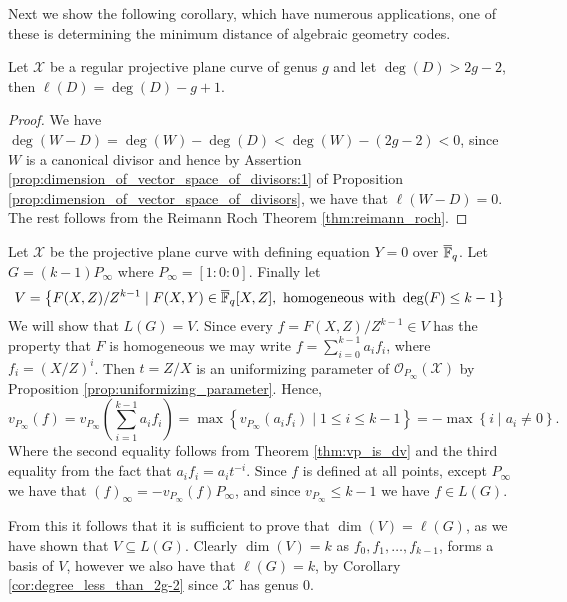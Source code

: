 Next we show the following corollary, which have numerous applications, one of these is determining the minimum distance of algebraic geometry codes.
\begin{corollary}\label{cor:degree_less_than_2g-2}
  Let $\mathcal{X}$ be a regular projective plane curve of genus $g$ and let $\deg(D) > 2g - 2$, then $\ell(D) = \deg(D) - g + 1$.
\end{corollary}
\begin{proof}
We have $\deg(W - D) = \deg(W) - \deg(D) < \deg(W) - (2g - 2) < 0$, since $W$ is a canonical divisor and hence by Assertion \ref{prop:dimension_of_vector_space_of_divisors:1} of Proposition \ref{prop:dimension_of_vector_space_of_divisors}, we have that $\ell(W - D) = 0$. The rest follows from the Reimann Roch Theorem \ref{thm:reimann_roch}.
\end{proof}

\begin{example}\label{exmp:divisors_for_rs_codes}
  Let $\mathcal{X}$ be the projective plane curve with defining equation $Y = 0$ over $\overline{\mathbb{F}}_{q}$. Let $G = (k - 1)P_{\infty}$ where $P_{\infty} = [1 : 0 : 0]$. Finally let
  \begin{equation*}
    V = \left\{F(X, Z) / Z^{k -1} \mid F(X, Y) \in \overline{\mathbb{F}}_{q}[X, Z], \text{ homogeneous with } \deg(F) \leq k - 1\right\}
  \end{equation*}
  We will show that $L(G) = V$. Since every $f = F(X, Z) / Z^{k - 1} \in V$ has the property that $F$ is homogeneous we may write $f = \sum_{i = 0}^{k - 1} a_{i} f_{i}$, where $f_{i} = (X / Z)^{i}$. Then $t = Z / X$ is an uniformizing parameter of $\mathcal{O}_{P_{\infty}}(\mathcal{X})$ by Proposition \ref{prop:uniformizing_parameter}. Hence,
  \begin{equation*}
  v_{P_{\infty}}(f) = v_{P_{\infty}}\left(\sum_{i = 1}^{k - 1} a_{i} f_{i}\right) = \max \left\{v_{P_{\infty}}(a_{i} f_{i}) \mid 1 \leq i \leq k - 1\right\} = -\max \left\{i \mid a_{i} \neq 0\right\}.
  \end{equation*}
  Where the second equality follows from Theorem \ref{thm:vp_is_dv} and the third equality from the fact that $a_{i} f_{i} = a_{i} t^{-i}$. Since $f$ is defined at all points, except $P_{\infty}$ we have that $(f)_{\infty} = -v_{P_{\infty}}(f) P_{\infty}$, and since $v_{P_{\infty}} \leq k - 1$ we have $f \in L(G)$.

  From this it follows that it is sufficient to prove that $\dim(V) = \ell(G)$, as we have shown that $V \subseteq L(G)$.
  Clearly $\dim(V) = k$ as $f_0, f_1, \ldots, f_{k - 1}$, forms a basis of $V$, however we also have that $\ell(G) = k$, by Corollary \ref{cor:degree_less_than_2g-2} since $\mathcal{X}$ has genus $0$.
\end{example}

